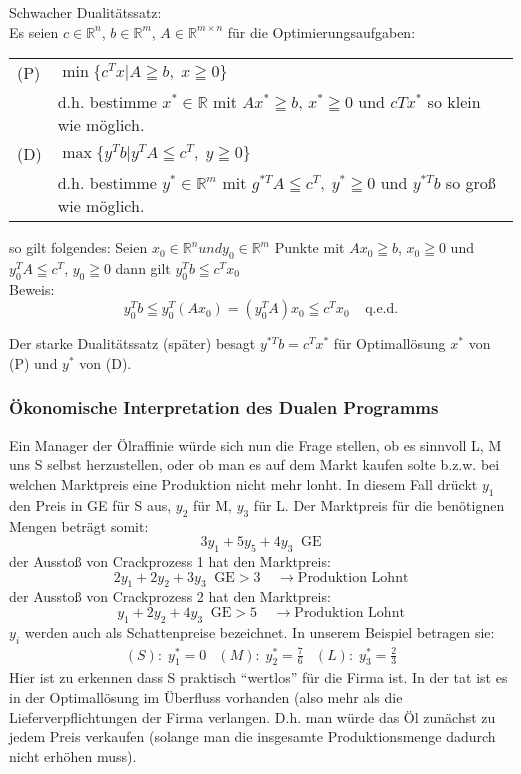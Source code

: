 \documentclass[12pt,titlepage,a4paper] {report}
\newcommand{\RR}{\mathbb{R}}
\begin{document}
\begin{satz}
Schwacher Dualitätssatz:\\
Es seien $c \in \RR^{n}$, $b \in \RR^{m}$, $A \in \RR^{m \times n}$ für die
Optimierungsaufgaben:

\begin{tabular}{ll}
(P)&$\min \{c^{T}x | A \geqq b, \; x\geqq 0\}$\\
&d.h. bestimme $x^{*} \in \RR$ mit $Ax^{*} \geqq b$, $x^{*} \geqq 0 $ und
$c{T}x^{*}$ so klein wie möglich.\\
(D)&$\max \{y^{T}b|y^{T}A \leqq c^{T}, \; y \geqq 0\}$\\
&d.h. bestimme  $y^{*} \in \RR^{m}$ mit $g^{*T}A \leqq c^{T}, \; y ^{*}
\geqq 0$ und $y^{*T}b$ so groß wie möglich.
\end{tabular}

so gilt folgendes: Seien $x_{0} \in \RR^{n} und y_{0} \in \RR^{m}$ Punkte
mit $Ax_{0} \geqq b $, $x_{0} \geqq 0$ und $y_{0}^{T}A \leqq c^{T}$,
$y_{0} \geqq 0$ dann gilt $y_{0}^{T}b \leqq c^{T} x_{0}$\\
Beweis:
\[y_{0}^{T}b \leqq y_{0}^{T}(Ax_{0}) = (y_{0}^{T}A)x_{0} \leqq c^{T}x_{0}
\; \; \; \; \mbox{q.e.d.}\] 
\end{satz}

Der starke Dualitätssatz (später) besagt $y^{*T}b =c^{T}x^{*}$ für
Optimallösung $x^{*}$ von (P) und $y^{*}$ von (D).

\subsubsection{Ökonomische Interpretation des Dualen Programms}

Ein Manager der Ölraffinie würde sich nun die Frage stellen, ob es sinnvoll
L, M uns S selbst herzustellen, oder ob man es auf dem Markt kaufen solte 
b.z.w.  bei welchen Marktpreis eine Produktion nicht mehr lonht. In diesem Fall
drückt $y_{1}$ den Preis in GE für S aus, $y_{2}$ für M, $y_{3}$ für L. Der
Marktpreis für die benötignen Mengen beträgt somit:
\[3y_{1} + 5y_{5} + 4y_{3} \; \; \mbox{GE}\]
der Ausstoß von Crackprozess 1 hat den Marktpreis:
\[2y_{1}+2y_{2}+3y_{3} \; \; \mbox{GE} > 3 \;\;\;\; \rightarrow \mbox{Produktion Lohnt}\]
der Ausstoß von Crackprozess 2 hat den Marktpreis:
\[y_{1}+2y_{2}+4y_{3} \;\; \mbox{GE} > 5 \;\;\;\; \rightarrow \mbox{Produktion Lohnt}\]
$y_{i}$ werden auch als Schattenpreise bezeichnet. In unserem Beispiel
betragen sie:
\[\begin{array}{lll}(S):\; y_{1}^{*}=0& (M):\; y_{2}^{*} =
\frac{7}{6}&(L):\;
y_{3}^{*} = \frac{2}{3}
\end{array}\]
Hier ist zu erkennen dass S praktisch "`wertlos"' für die Firma ist. In der
tat ist es in der Optimallösung im Überfluss vorhanden (also mehr als die
Lieferverpflichtungen der Firma verlangen. D.h. man würde das Öl zunächst
zu jedem Preis verkaufen (solange man die insgesamte Produktionsmenge
dadurch nicht erhöhen muss).
\end{document}
